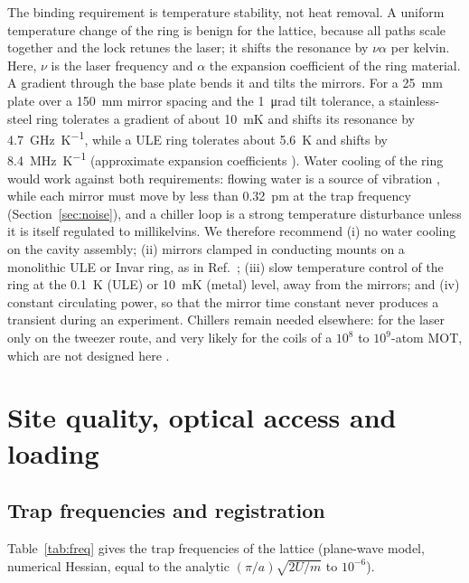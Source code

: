 \documentclass[11pt]{article}
\begin{document}
The binding requirement is temperature stability, not heat removal. A uniform temperature change of the ring is
benign for the lattice, because all paths scale together and the lock retunes the laser; it shifts the
resonance by $\nu\alpha$ per kelvin. Here, $\nu$ is the laser frequency and $\alpha$ the expansion coefficient
of the ring material. A gradient through the base plate bends it and tilts the mirrors. For a
\SI{25}{\milli\metre} plate over a \SI{150}{\milli\metre} mirror spacing \placeholder{[CONFIRM?]} and the
\SI{1}{\micro\radian} tilt tolerance, a stainless-steel ring tolerates a gradient of about \SI{10}{\milli\kelvin}
and shifts its resonance by \SI{4.7}{\giga\hertz\per\kelvin}, while a ULE ring tolerates about \SI{5.6}{\kelvin}
and shifts by \SI{8.4}{\mega\hertz\per\kelvin} (approximate expansion coefficients
). Water cooling of the ring would work against both requirements: flowing water is
a source of vibration , while each mirror must move by less than \SI{0.32}{\pico\metre}\rtHz{} at the trap
frequency (Section~\ref{sec:noise}), and a chiller loop is a strong temperature disturbance unless it is itself
regulated to millikelvins. We therefore recommend (i) no water cooling on the cavity assembly; (ii) mirrors
clamped in conducting mounts on a monolithic ULE or Invar ring, as in Ref.~\cite{Park2022}; (iii) slow
temperature control of the ring at the \SI{0.1}{\kelvin} (ULE) or \SI{10}{\milli\kelvin} (metal) level, away
from the mirrors; and (iv) constant circulating power, so that the mirror time constant never produces a
transient during an experiment. Chillers remain needed elsewhere: for the laser only on the tweezer route, and
very likely for the coils of a $10^{8}$ to $10^{9}$-atom MOT, which are not designed here
.

\section{Site quality, optical access and loading}
\label{sec:access}

\subsection{Trap frequencies and registration}

Table~\ref{tab:freq} gives the trap frequencies of the lattice (plane-wave model, numerical Hessian,
equal to the analytic $(\pi/a)\sqrt{2U/m}$ to $10^{-6}$).
\end{document}
